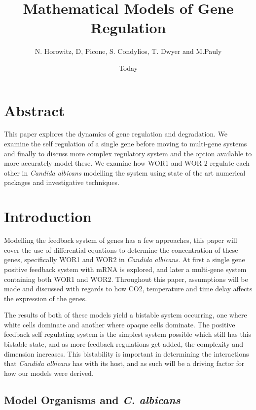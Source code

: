 \documentclass[]{article}
\begin{document}
\title{Mathematical Models of Gene Regulation}
\author{N. Horowitz, D, Picone, S. Condylios, T. Dwyer and M.Pauly}
\date{Today}
\maketitle

\section*{Abstract}
This paper explores the dynamics of gene regulation and degradation. We examine the self regulation of a single gene before moving to multi-gene systems and finally to discuss more complex regulatory system and the option available to more accurately model these. We examine how WOR1 and WOR 2 regulate each other in \textit{Candida albicans} modelling the system using state of the art numerical packages and investigative techniques. 
\pagebreak

\section*{Introduction}
Modelling the feedback system of genes has a few approaches, this paper will cover the use of differential equations to determine the concentration of these genes, specifically WOR1 and WOR2 in \textit{Candida albicans}. At first a single gene positive feedback system with mRNA is explored, and later a multi-gene system containing both WOR1 and WOR2. Throughout this paper, assumptions will be made and discussed with regards to how CO2, temperature and time delay affects the expression of the genes.

The results of both of these models yield a bistable system occurring, one where white cells dominate and another where opaque cells dominate. The positive feedback self regulating system is the simplest system possible which still has this bistable state, and as more feedback regulations get added, the complexity and dimension increases. This bistability is important in determining the interactions that \textit{Candida albicans} has with its host, and as such will be a driving factor for how our models were derived.

   \subsection{Model Organisms and \textit{C. albicans} }
\end{document}
